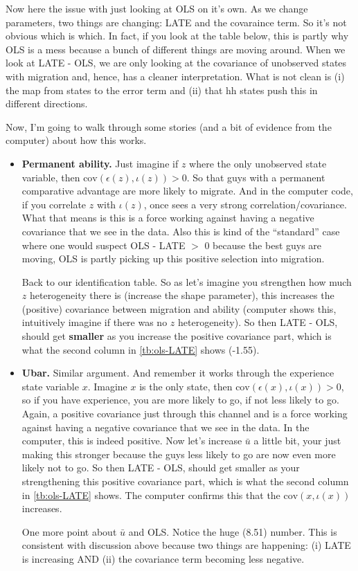 \documentclass[pdftex,11pt]{article}
\begin{document}
Now here the issue with just looking at OLS on it's own. As we change parameters, two things are changing: LATE and the covaraince term. So it's not obvious which is which. In fact, if you look at the table below, this is partly why OLS is a mess because a bunch of different things are moving around. When we look at LATE - OLS, we are only looking at the covariance of unobserved states with migration and, hence, has a cleaner interpretation. What is not clean is (i) the map from states to the error term and (ii) that hh states push this in different directions.

Now, I'm going to walk through some stories (and a bit of evidence from the computer) about how this works.
\begin{itemize}
\item \textbf{Permanent ability.} Just imagine if $z$ where the only unobserved state variable, then  $\mathrm{cov}( \epsilon(z), \iota(z)) > 0$. So that guys with a permanent comparative advantage are more likely to migrate. And in the computer code, if you correlate $z$ with $\iota(z)$, once sees a very strong correlation/covariance. What that means is this is a force working against having a negative covariance that we see in the data. Also this is kind of the ``standard'' case where one would suspect OLS - LATE $>$ 0 because the best guys are moving, OLS is partly picking up this positive selection into migration.

    Back to our identification table. So as let's imagine you strengthen how much $z$ heterogeneity there is (increase the shape parameter), this increases the (positive) covariance between migration and ability (computer shows this, intuitively imagine if there was no $z$ heterogeneity). So then LATE - OLS, should get \textbf{smaller} as you increase the positive covariance part, which is what the second column in \ref{tb:ols-LATE} shows (-1.55).

\item \textbf{Ubar.} Similar argument. And remember it works through the experience state variable $x$.  Imagine $x$ is the only state, then $\mathrm{cov}( \epsilon(x), \iota(x)) > 0 $, so if you have experience, you are more likely to go, if not less likely to go. Again, a positive covariance just through this channel and is a force working against having a negative covariance that we see in the data. In the computer, this is indeed positive. Now let's increase $\bar u$ a little bit, your just making this stronger because the guys less likely to go are now even more likely not to go. So then LATE - OLS, should get smaller as your strengthening this positive covariance part, which is what the second column in \ref{tb:ols-LATE} shows. The computer confirms this that the $\mathrm{cov}(x, \iota(x))$ increases.

    One more point about $\bar u$ and OLS. Notice the huge (8.51) number. This is consistent with discussion above because two things are happening: (i) LATE is increasing AND (ii) the covariance term becoming less negative.
\end{itemize}
\end{document}
